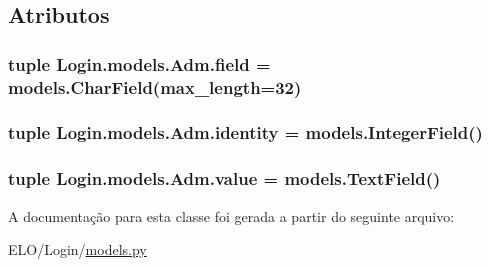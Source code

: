 \subsection{Atributos}
\hypertarget{classLogin_1_1models_1_1Adm_acbc72ad1229824e3368db724871d6fdc}{
\subsubsection[{field}]{\setlength{\rightskip}{0pt plus 5cm}tuple Login.\-models.\-Adm.\-field = models.\-Char\-Field(max\-\_\-length=32)\hspace{0.3cm}{\ttfamily [static]}}}\label{d4/d48/classLogin_1_1models_1_1Adm_acbc72ad1229824e3368db724871d6fdc}
\hypertarget{classLogin_1_1models_1_1Adm_a304ca44602e775ea01d2e814c2dbb670}{
\subsubsection[{identity}]{\setlength{\rightskip}{0pt plus 5cm}tuple Login.\-models.\-Adm.\-identity = models.\-Integer\-Field()\hspace{0.3cm}{\ttfamily [static]}}}\label{d4/d48/classLogin_1_1models_1_1Adm_a304ca44602e775ea01d2e814c2dbb670}
\hypertarget{classLogin_1_1models_1_1Adm_ad783913f8b33250180f9f562ff56b0c9}{
\subsubsection[{value}]{\setlength{\rightskip}{0pt plus 5cm}tuple Login.\-models.\-Adm.\-value = models.\-Text\-Field()\hspace{0.3cm}{\ttfamily [static]}}}\label{d4/d48/classLogin_1_1models_1_1Adm_ad783913f8b33250180f9f562ff56b0c9}


A documentação para esta classe foi gerada a partir do seguinte arquivo\-:\begin{DoxyCompactItemize}
\item 
E\-L\-O/\-Login/\hyperlink{Login_2models_8py}{models.\-py}\end{DoxyCompactItemize}
